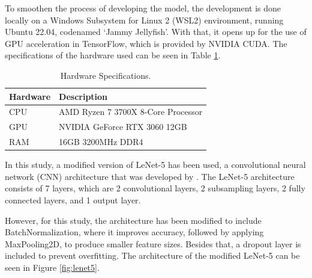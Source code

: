 To smoothen the process of developing the model, the development is done locally on a Windows Subsystem for Linux 2 (WSL2) environment, running Ubuntu 22.04, codenamed `Jammy Jellyfish'. With that, it opens up for the use of GPU acceleration in TensorFlow, which is provided by NVIDIA CUDA. The specifications of the hardware used can be seen in Table \ref{table:hardware}.

\begin{longtable}{|p{3cm}|p{7.5cm}|}
\caption{Hardware Specifications.}
\label{table:hardware}\\
\hline
\textbf{Hardware} & \textbf{Description} \\ [0.5ex]
\hline
\endfirsthead
\hline
\endhead
\hline
\endfoot
\endlastfoot
CPU & AMD Ryzen 7 3700X 8-Core Processor \\ \hline
GPU & NVIDIA GeForce RTX 3060 12GB \\ \hline
RAM & 16GB 3200MHz DDR4 \\ \hline
\end{longtable}


In this study, a modified version of LeNet-5 has been used, a convolutional neural network (CNN) architecture that was developed by \textcite{Lecun1998}. The LeNet-5 architecture consists of 7 layers, which are 2 convolutional layers, 2 subsampling layers, 2 fully connected layers, and 1 output layer. 

However, for this study, the architecture has been modified to include BatchNormalization, where it improves accuracy, followed by applying MaxPooling2D, to produce smaller feature sizes. Besides that, a dropout layer is included to prevent overfitting. The architecture of the modified LeNet-5 can be seen in Figure \ref{fig:lenet5}.

